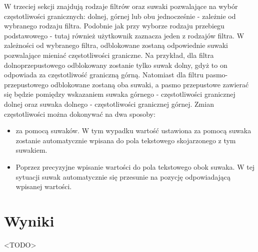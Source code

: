 W trzeciej sekcji znajdują rodzaje filtrów oraz suwaki pozwalające na wybór częstotliwości granicznych: dolnej, górnej lub obu jednocześnie - zależnie od wybranego rodzaju filtra. Podobnie jak przy wyborze rodzaju przebiegu podstawowego - tutaj również użytkownik zaznacza jeden z rodzajów filtra. W zależności od wybranego filtra, odblokowane zostaną odpowiednie suwaki pozwalające mieniać częstotliwości graniczne. Na przykład, dla filtra dolnoprzepustowego odblokowany zostanie tylko suwak dolny, gdyż to on odpowiada za częstotliwość graniczną górną. Natomiast dla filtru pasmo-przepustowego odblokowane zostaną oba suwaki, a pasmo przepustowe zawierać się będzie pomiędzy wskazaniem suwaka górnego - częstotliwości granicznej dolnej oraz suwaka dolnego - częstotliwości granicznej górnej.
Zmian częstotliwości można dokonywać na dwa sposoby:
\begin{itemize}
	\item za pomocą suwaków. W tym wypadku wartość ustawiona za pomocą suwaka zostanie automatycznie wpisana do pola tekstowego skojarzonego z tym suwakiem.
	\item Poprzez precyzyjne wpisanie wartości do pola tekstowego obok suwaka. W tej sytuacji suwak automatycznie się przesunie na pozycję odpowiadającą wpisanej wartości.
\end{itemize}

\section{Wyniki}
<TODO>
